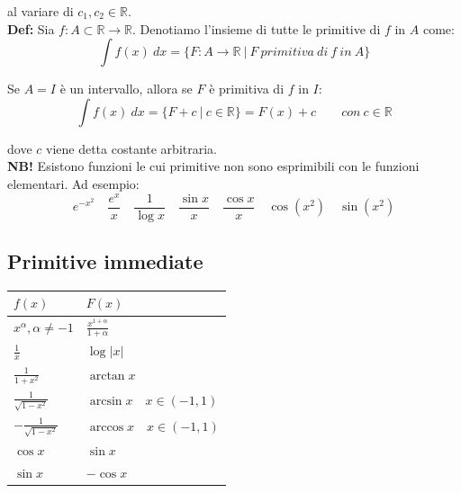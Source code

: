 \documentclass{article}
\begin{document}
\noindent al variare di $c_1, c_2 \in \mathbb{R}$.\\

\noindent\textbf{Def:} Sia $f: A \subset \mathbb{R} \xrightarrow{} \mathbb{R}$. Denotiamo l'insieme di tutte le primitive di $f$ in $A$ come:
\begin{equation*}
    \int f(x) \ dx = \{F: A \xrightarrow{} \mathbb{R} \ | \ F \ primitiva \ di \ f \ in \ A\}
\end{equation*}

\noindent Se $A = I$ è un intervallo, allora se $F$ è primitiva di $f$ in $I$:
\begin{equation*}
    \int f(x) \ dx = \{F + c \ | \ c \in \mathbb{R}\} = F(x) + c \qquad con \ c \in \mathbb{R}
\end{equation*}

\noindent dove $c$ viene detta costante arbitraria.\\

\noindent\textbf{NB!} Esistono funzioni le cui primitive non sono esprimibili con le funzioni elementari. Ad esempio:
\begin{equation*}
    e^{-x^2} \quad \frac{e^x}{x} \quad \frac{1}{\log x} \quad \frac{\sin x}{x} \quad \frac{\cos x}{x} \quad \cos(x^2) \quad \sin(x^2)
\end{equation*}

\subsection{Primitive immediate}
\begin{table}[h]
\begin{center}
    \renewcommand{\arraystretch}{1.5}
    \setlength{\tabcolsep}{10pt}
    \begin{tabular}{|>{\centering\arraybackslash}m{5cm}|>{\centering\arraybackslash}m{5cm}|}
    \hline
    $f(x)$ & $F(x)$ \\ \hline
    $x^\alpha, \alpha \neq -1$ & $\frac{x^{1 + \alpha}}{1 + \alpha}$ \\ \hline
    $\frac{1}{x}$ & $\log|x|$ \\ \hline
    $\frac{1}{1 + x^2}$ & $\arctan x$ \\ \hline
    $\frac{1}{\sqrt{1 - x^2}}$ & $\arcsin x \quad x \in (-1, 1)$ \\ \hline
    $-\frac{1}{\sqrt{1 - x^2}}$ & $\arccos x \quad x \in (-1, 1)$ \\ \hline
    $\cos x$ & $\sin x$ \\ \hline
    $\sin x$ & $-\cos x$ \\ \hline
    \end{tabular}
\end{center}
\end{table}
\end{document}
